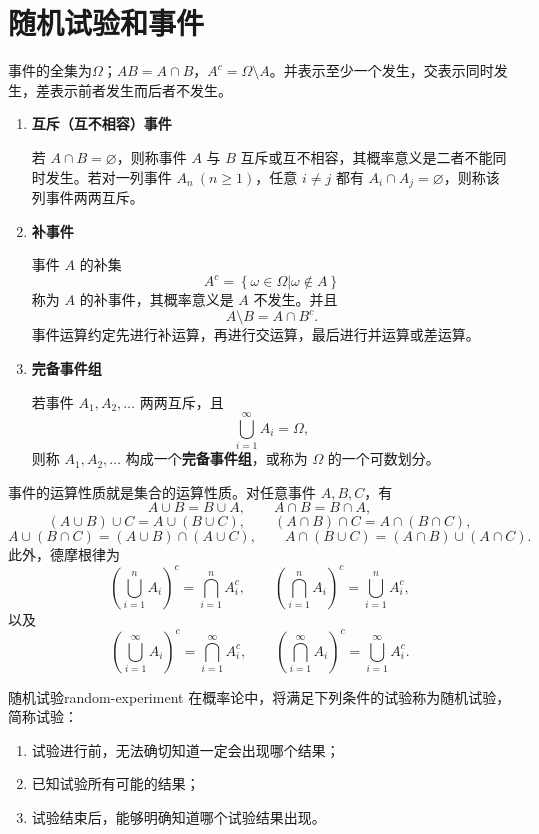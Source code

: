 
\clearpage\section{随机试验和事件}\label{k:events}
事件的全集为$\Omega$；$AB=A\cap B$，$A^c=\Omega\setminus A$。并表示至少一个发生，交表示同时发生，差表示前者发生而后者不发生。

\begin{enumerate}
\item \textbf{互斥（互不相容）事件}

若 $A\cap B=\varnothing$，则称事件 $A$ 与 $B$ 互斥或互不相容，其概率意义是二者不能同时发生。若对一列事件 $A_n\ (n\geq1)$，任意 $i\ne j$ 都有 $A_i\cap A_j=\varnothing$，则称该列事件两两互斥。

\item \textbf{补事件}

事件 $A$ 的补集
\[
A^c=\left\{\omega\in\Omega\mathrel{\big|}\omega\notin A\right\}
\]
称为 $A$ 的补事件，其概率意义是 $A$ 不发生。并且
\[
A\setminus B=A\cap B^c.
\]
事件运算约定先进行补运算，再进行交运算，最后进行并运算或差运算。

\item \textbf{完备事件组}

若事件 $A_1,A_2,\ldots$ 两两互斥，且
\[
\bigcup_{i=1}^{\infty}A_i=\Omega,
\]
则称 $A_1,A_2,\ldots$ 构成一个\textbf{完备事件组}，或称为 $\Omega$ 的一个可数划分。
\end{enumerate}

事件的运算性质就是集合的运算性质。对任意事件 $A,B,C$，有
\[
A\cup B=B\cup A,\qquad A\cap B=B\cap A,
\]
\[
(A\cup B)\cup C=A\cup(B\cup C),\qquad
(A\cap B)\cap C=A\cap(B\cap C),
\]
\[
A\cup(B\cap C)=(A\cup B)\cap(A\cup C),\qquad
A\cap(B\cup C)=(A\cap B)\cup(A\cap C).
\]
此外，德摩根律为
\[
\left(\bigcup_{i=1}^{n}A_i\right)^c=\bigcap_{i=1}^{n}A_i^c,
\qquad
\left(\bigcap_{i=1}^{n}A_i\right)^c=\bigcup_{i=1}^{n}A_i^c,
\]
以及
\[
\left(\bigcup_{i=1}^{\infty}A_i\right)^c=\bigcap_{i=1}^{\infty}A_i^c,
\qquad
\left(\bigcap_{i=1}^{\infty}A_i\right)^c=\bigcup_{i=1}^{\infty}A_i^c.
\]

\begin{mydefinition}{随机试验}{random-experiment}
在概率论中，将满足下列条件的试验称为随机试验，简称试验：
\begin{enumerate}
\item 试验进行前，无法确切知道一定会出现哪个结果；
\item 已知试验所有可能的结果；
\item 试验结束后，能够明确知道哪个试验结果出现。
\end{enumerate}
\end{mydefinition}

